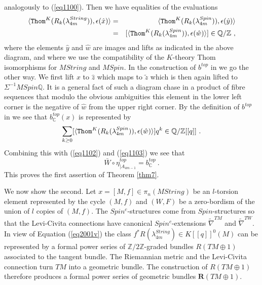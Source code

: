 \documentclass[12pt]{article}
\newcommand{\Thom}{{\tt Thom}}
\newcommand{\Z}{{\mathbb{Z}}}
\newcommand{\Q}{{\mathbb{Q}}}
\newcommand{\C}{{\mathbb{C}}}
\newcommand{\bR}{{\mathbf{R}}}
\begin{document}
analogously to (\ref{eq1100}). Then we have equalities of the  evaluations
\begin{eqnarray}\label{eq1103} \langle \Thom^{K}(R_{k}(\lambda^{String}_{4m})), \epsilon(\hat x)\rangle&=& \langle\Thom^{K}(R_{k}(\lambda^{Spin}_{4m})), \epsilon(\hat y) \rangle\\
&=& [\langle\Thom^{K}(R_{k}(\lambda^{Spin}_{4m})),\epsilon(\hat w)\rangle]\in \Q/\Z\ ,\nonumber\end{eqnarray}
where the elements $\hat y$ and $\hat w$ are images and lifts as indicated in the above diagram, 
and where we use the compatibility of the $K$-theory Thom isomorphisms for $MString$ and $MSpin$.
In the construction of $b^{top}$ in \cite[Sec 4.1]{2009arXiv0912.4875B}  we go the other way. We 
first lift $x$ to $\hat z$ which maps to $\tilde z$ which is then again lifted to
$\Sigma^{-1}MSpin\Q$. It is a general fact of such a diagram chase in a product of fibre sequences that
modulo the obvious ambiguities 
this element in the lower left  corner is the negative of $\hat w$ from the upper right corner.
By the definition of $b^{top}$ in \cite[Sec 4.1]{2009arXiv0912.4875B} we see that 
$b_{\C}^{top}(x)$ is represented by
$$\sum_{k\ge 0} [\langle \Thom^{K}(R_{k}(\lambda^{Spin}_{4m})), \epsilon (\hat w)\rangle] q^{k}\in \Q/\Z[[q]]\ .$$
Combining this with (\ref{eq1102}) and (\ref{eq1103}) we see that
$$\bar W\circ \eta^{top}_{|A_{4m-1}}=b_{\C}^{top}\ .$$
This proves the first assertion of Theorem \ref{thm7}.

We now show the second.
Let $x=[M,f]\in \pi_{n}(MString)$ be an $l$-torsion element represented by the cycle $(M,f)$ and $(W,F)$ be a zero-bordism of the union of $l$ copies of $(M,f)$. 
The $Spin^{c}$-structures come from $Spin$-structures so that the Levi-Civita connections have  canonical $Spin^{c}$-extensions $\tilde \nabla^{TM}$ and $\tilde \nabla^{TW}$.
In view of Equation (\ref{eq2001v}) the class
  $f^{*}R(\lambda^{String}_{4m})\in K[[q]]^{0}(M)$ can be represented by a formal power series of $\Z/2\Z$-graded bundles $R(TM\oplus 1)$ associated to the tangent bundle. The Riemannian metric and the Levi-Civita connection turn $TM$ into a geometric bundle. The construction of $R(TM\oplus 1)$ therefore produces a formal power series of    geometric bundles $\bR(TM\oplus 1)$. 
\end{document}
